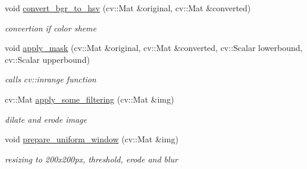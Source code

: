 \begin{DoxyCompactItemize}
\mbox{\label{class_character___recognition___algorithm_ab393524887755e6e363d281856b8aa1e}} 
void \mbox{\hyperlink{class_character___recognition___algorithm_ab393524887755e6e363d281856b8aa1e}{convert\+\_\+bgr\+\_\+to\+\_\+hsv}} (cv\+::\+Mat \&original, cv\+::\+Mat \&converted)
\begin{DoxyCompactList}\small\item\em convertion if color sheme \end{DoxyCompactList}\item 
\mbox{\label{class_character___recognition___algorithm_af84b6a4dad5edcf27f65d5dbc884efb2}} 
void \mbox{\hyperlink{class_character___recognition___algorithm_af84b6a4dad5edcf27f65d5dbc884efb2}{apply\+\_\+mask}} (cv\+::\+Mat \&original, cv\+::\+Mat \&converted, cv\+::\+Scalar lowerbound, cv\+::\+Scalar upperbound)
\begin{DoxyCompactList}\small\item\em calls cv\+::inrange function \end{DoxyCompactList}\item 
\mbox{\label{class_character___recognition___algorithm_a5f8eaa507a9b61ba71d361e2306d0110}} 
cv\+::\+Mat \mbox{\hyperlink{class_character___recognition___algorithm_a5f8eaa507a9b61ba71d361e2306d0110}{apply\+\_\+some\+\_\+filtering}} (cv\+::\+Mat \&img)
\begin{DoxyCompactList}\small\item\em dilate and erode image \end{DoxyCompactList}\item 
\mbox{\label{class_character___recognition___algorithm_a7eb8c5de6b5fc691530c1e57b499fcbd}} 
void \mbox{\hyperlink{class_character___recognition___algorithm_a7eb8c5de6b5fc691530c1e57b499fcbd}{prepare\+\_\+uniform\+\_\+window}} (cv\+::\+Mat \&img)
\begin{DoxyCompactList}\small\item\em resizing to 200x200px, threshold, erode and blur \end{DoxyCompactList}\item 
\mbox{\label{class_character___recognition___algorithm_a21924694ba0aacb82054ea33191cb52a}} 

\end{DoxyCompactItemize}
